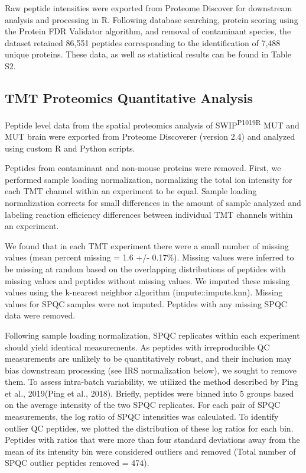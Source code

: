 Raw peptide intensities were exported from Proteome Discover for downstream
analysis and processing in R. Following database searching, protein scoring
using the Protein FDR Validator algorithm, and removal of contaminant species,
the dataset retained 86,551 peptides corresponding to the identification of
7,488 unique proteins. These data, as well as statistical results can be found
in Table S2.

\subsection{TMT Proteomics Quantitative Analysis}

Peptide level data from the
spatial proteomics analysis of SWIP\textsuperscript{P1019R} MUT and MUT brain
were exported from Proteome Discoverer (version 2.4) and analyzed using custom R
and Python scripts.

Peptides from contaminant and non-mouse proteins were
removed. First, we performed sample loading normalization, normalizing the total
ion intensity for each TMT channel within an experiment to be equal. Sample
loading normalization corrects for small differences in the amount of sample
analyzed and labeling reaction efficiency differences between individual TMT
channels within an experiment.

We found that in each TMT experiment there were a small number of missing values
(mean percent missing = 1.6 +/- 0.17\%). Missing values were inferred to be
missing at random based on the overlapping distributions of peptides with
missing values and peptides without missing values. We imputed these missing
values using the k-nearest neighbor algorithm (impute::impute.knn). Missing
values for SPQC samples were not imputed. Peptides with any missing SPQC data
were removed.

Following sample loading normalization, SPQC replicates within each experiment
should yield identical measurements. As peptides with irreproducible QC
measurements are unlikely to be quantitatively robust, and their inclusion may
bias downstream processing (see IRS normalization below), we sought to remove
them. To assess intra-batch variability, we utilized the method described by
Ping et al., 2019(Ping et al., 2018). Briefly, peptides were binned into 5
groups based on the average intensity of the two SPQC replicates. For each pair
of SPQC measurements, the log ratio of SPQC intensities was calculated. To
identify outlier QC peptides, we plotted the distribution of these log ratios
for each bin. Peptides with ratios that were more than four standard deviations
away from the mean of its intensity bin were considered outliers and removed
(Total number of SPQC outlier peptides removed = 474).

